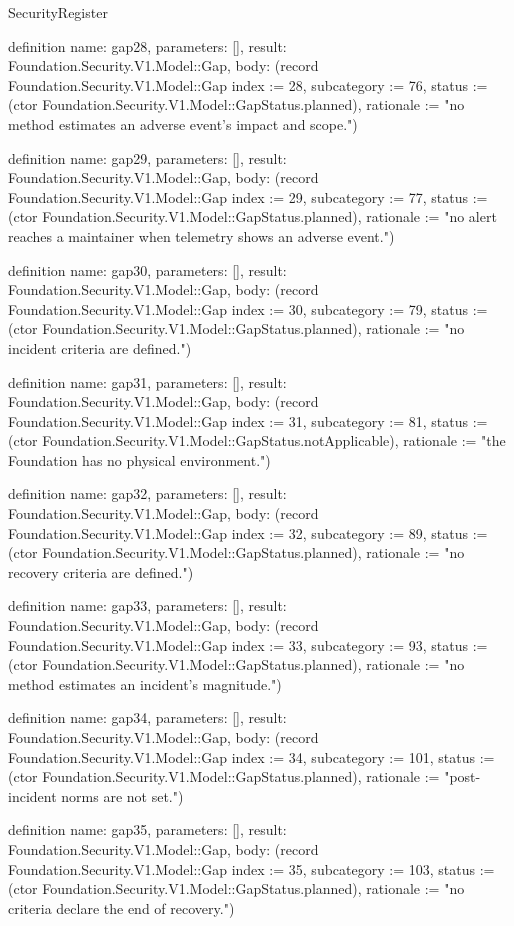 \begin{lexlean}{SecurityRegister}
\begin{semanticmodule}
definition{
  name: gap28,
  parameters: [],
  result: Foundation.Security.V1.Model::Gap,
  body: (record Foundation.Security.V1.Model::Gap {index := 28, subcategory := 76, status := (ctor Foundation.Security.V1.Model::GapStatus.planned), rationale := "no method estimates an adverse event's impact and scope."})
}

definition{
  name: gap29,
  parameters: [],
  result: Foundation.Security.V1.Model::Gap,
  body: (record Foundation.Security.V1.Model::Gap {index := 29, subcategory := 77, status := (ctor Foundation.Security.V1.Model::GapStatus.planned), rationale := "no alert reaches a maintainer when telemetry shows an adverse event."})
}

definition{
  name: gap30,
  parameters: [],
  result: Foundation.Security.V1.Model::Gap,
  body: (record Foundation.Security.V1.Model::Gap {index := 30, subcategory := 79, status := (ctor Foundation.Security.V1.Model::GapStatus.planned), rationale := "no incident criteria are defined."})
}

definition{
  name: gap31,
  parameters: [],
  result: Foundation.Security.V1.Model::Gap,
  body: (record Foundation.Security.V1.Model::Gap {index := 31, subcategory := 81, status := (ctor Foundation.Security.V1.Model::GapStatus.notApplicable), rationale := "the Foundation has no physical environment."})
}

definition{
  name: gap32,
  parameters: [],
  result: Foundation.Security.V1.Model::Gap,
  body: (record Foundation.Security.V1.Model::Gap {index := 32, subcategory := 89, status := (ctor Foundation.Security.V1.Model::GapStatus.planned), rationale := "no recovery criteria are defined."})
}

definition{
  name: gap33,
  parameters: [],
  result: Foundation.Security.V1.Model::Gap,
  body: (record Foundation.Security.V1.Model::Gap {index := 33, subcategory := 93, status := (ctor Foundation.Security.V1.Model::GapStatus.planned), rationale := "no method estimates an incident's magnitude."})
}

definition{
  name: gap34,
  parameters: [],
  result: Foundation.Security.V1.Model::Gap,
  body: (record Foundation.Security.V1.Model::Gap {index := 34, subcategory := 101, status := (ctor Foundation.Security.V1.Model::GapStatus.planned), rationale := "post-incident norms are not set."})
}

definition{
  name: gap35,
  parameters: [],
  result: Foundation.Security.V1.Model::Gap,
  body: (record Foundation.Security.V1.Model::Gap {index := 35, subcategory := 103, status := (ctor Foundation.Security.V1.Model::GapStatus.planned), rationale := "no criteria declare the end of recovery."})
}


\end{semanticmodule}
\end{lexlean}
